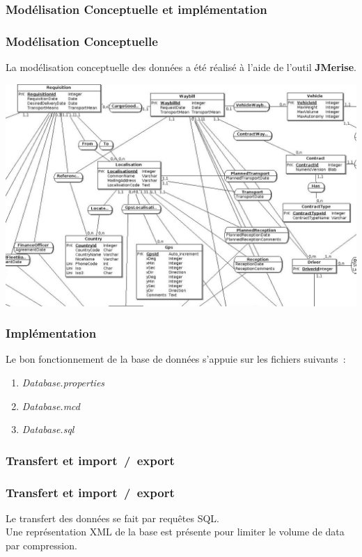 \subsubsection[Modélisation Conceptuelle et implémentation]{Modélisation Conceptuelle et implémentation}
\begin{frame}
\frametitle{Modélisation Conceptuelle}
La modélisation conceptuelle des données a été réalisé à l'aide de l'outil \textbf{JMerise}.\\
\begin{center}
\includegraphics[scale=0.15]{Images/DatabaseSize}
\end{center}
\end{frame}

\begin{frame}
\frametitle{Implémentation}
Le bon fonctionnement de la base de données s'appuie sur les fichiers suivants~:
\begin{enumerate}
	\item<2-> \emph{Database.properties}
	\item<3-> \emph{Database.mcd}
	\item<4-> \emph{Database.sql}
\end{enumerate}
\end{frame}

\subsubsection[Transfert et import~/~export]{Transfert et import~/~export}
\begin{frame}
\frametitle{Transfert et import~/~export}
Le transfert des données se fait par requêtes SQL.\\
Une représentation XML de la base est présente pour limiter le volume de data par compression.\\
\end{frame}

